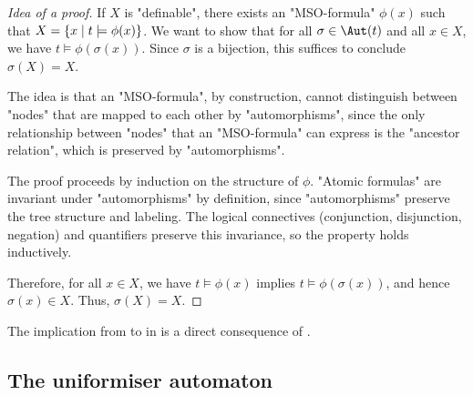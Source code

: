 \documentclass[a4paper,UKenglish,cleveref, autoref, thm-restate]{lipics-v2021}
\begin{document}
\begin{proof}[Idea of a proof]
	If $X$ is "definable", there exists an "MSO-formula" $\phi(x)$ such that $X = \left\{x \mid t \models \phi(x)\right\}$.
	We want to show that for all $\sigma \in \Aut(t)$ and all $x \in X$, we have $t \models \phi(\sigma(x))$.
	Since $\sigma$ is a bijection, this suffices to conclude $\sigma(X) = X$.

	The idea is that an "MSO-formula", by construction, cannot distinguish between "nodes" that are mapped to each other by "automorphisms", since
	the only relationship between "nodes" that an "MSO-formula" can express is the "ancestor relation", which is preserved by "automorphisms".

	The proof proceeds by induction on the structure of $\phi$. "Atomic formulas" are invariant under "automorphisms" by definition,
	since "automorphisms" preserve the tree structure and labeling. The logical connectives (conjunction, disjunction, negation)
	and quantifiers preserve this invariance, so the property holds inductively.

	Therefore, for all $x \in X$, we have $t \models \phi(x)$ implies $t \models \phi(\sigma(x))$, and hence $\sigma(x) \in X$. Thus, $\sigma(X) = X$.
\end{proof}

The implication from  to  in  is a direct consequence of .

\subsection{The uniformiser automaton}\label{section:uniformiser-automaton}
\end{document}
